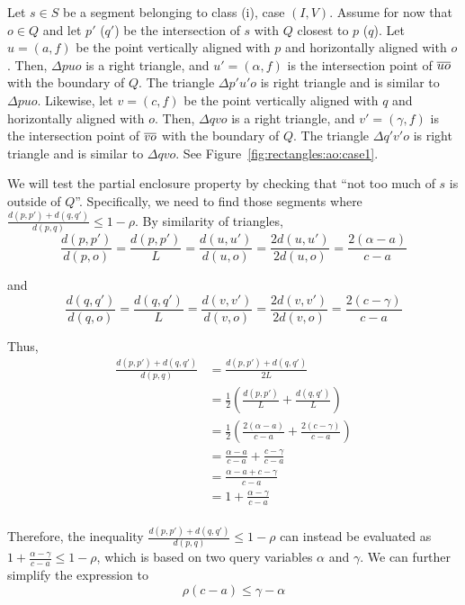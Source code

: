 Let $s \in S$ be a segment belonging to class (i), case $(I, V)$.
Assume for now that $o \in Q$ and let $p'$ ($q'$) be the intersection of $s$ with $Q$ closest to $p$ ($q$).  
Let $u = (a, f)$ be the point vertically aligned with $p$ and horizontally aligned with $o$. Then, $\Delta p u o$ is a right triangle, and $u' = (\alpha, f)$ is the intersection point of $\overline{u o}$ with the boundary of $Q$.  
The triangle $\Delta p' u' o$ is right triangle and is similar to $\Delta p u o$. 
Likewise, let $v = (c, f)$ be the point vertically aligned with $q$ and horizontally aligned with $o$. Then, $\Delta q v o$ is a right triangle, and $v' = (\gamma, f)$ is the intersection point of $\overline{v o}$ with the boundary of $Q$. The triangle $\Delta q' v' o$ is right triangle and is similar to $\Delta q v o$. See Figure~\ref{fig:rectangles:ao:case1}.

We will test the partial enclosure property by checking that ``not too much of $s$ is outside of $Q$''. Specifically, we need to find those segments where $\frac{d(p, p') + d(q, q')}{d(p, q)} \leq 1 - \rho$. By similarity of triangles, 
\[ 
\frac{d(p, p')}{d(p, o)} = \frac{d(p, p')}{L} = \frac{d(u, u')}{d(u, o)} = \frac{2 d(u, u')}{2 d(u, o)} = \frac{2(\alpha - a)}{c - a}
\]

\noindent and 
\[ 
\frac{d(q, q')}{d(q, o)} = \frac{d(q, q')}{L} = \frac{d(v, v')}{d(v, o)} = \frac{2 d(v, v')}{2 d(v, o)} = \frac{2(c - \gamma)}{c - a}
\]

\noindent Thus,
\[
\begin{split} 
\frac{d(p, p') + d(q, q')}{d(p, q)}
%
&= \frac{d(p, p') + d(q, q')}{2L} \\
%
&= \frac{1}{2} \left ( \frac{d(p, p')}{L} + \frac{d(q, q')}{L} \right ) \\
%
&= \frac{1}{2} \left ( \frac{2(\alpha - a)}{c - a} + \frac{2(c - \gamma)}{c - a} \right ) \\
%
&= \frac{\alpha - a}{c - a} + \frac{c - \gamma}{c - a} \\
%
&= \frac{\alpha - a + c - \gamma}{c - a} \\
%
&= 1 + \frac{\alpha - \gamma}{c - a} \\
%
\end{split}
\]

Therefore, the inequality $\frac{d(p, p') + d(q, q')}{d(p, q)} \leq 1 - \rho$ can instead be evaluated as $1 + \frac{\alpha - \gamma}{c - a} \leq 1 - \rho$, which is based on two query variables $\alpha$ and $\gamma$.  We can further simplify the expression to
\[ 
\rho(c - a) \leq \gamma - \alpha
\]

